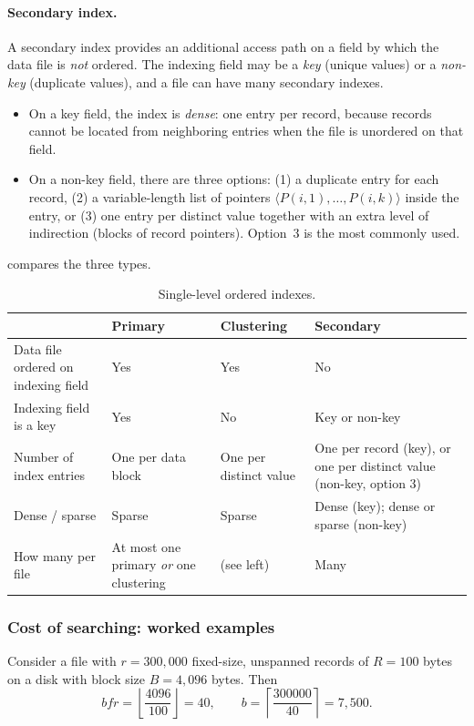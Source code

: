 \paragraph{Secondary index.}
A secondary index provides an additional access path on a field by which the data file is
\emph{not} ordered. The indexing field may be a \emph{key} (unique values) or a \emph{non-key}
(duplicate values), and a file can have many secondary indexes.
\begin{itemize}
  \item On a key field, the index is \emph{dense}: one entry per record, because records cannot
        be located from neighboring entries when the file is unordered on that field.
  \item On a non-key field, there are three options: (1) a duplicate entry for each record, (2)
        a variable-length list of pointers $\langle P(i,1),\dots,P(i,k)\rangle$ inside the entry,
        or (3) one entry per distinct value together with an extra level of indirection (blocks
        of record pointers). Option~3 is the most commonly used.
\end{itemize}

 compares the three types.

\begin{table}[H]
\centering
\small
\begin{tabularx}{\textwidth}{@{}l>{\raggedright\arraybackslash}X>{\raggedright\arraybackslash}X>{\raggedright\arraybackslash}X@{}}
\toprule
 & \textbf{Primary} & \textbf{Clustering} & \textbf{Secondary} \\
\midrule
Data file ordered on indexing field & Yes & Yes & No \\
Indexing field is a key & Yes & No & Key or non-key \\
Number of index entries & One per data block & One per distinct value & One per record (key), or one per distinct value (non-key, option 3) \\
Dense / sparse & Sparse & Sparse & Dense (key); dense or sparse (non-key) \\
How many per file & At most one primary \emph{or} one clustering & (see left) & Many \\
\bottomrule
\end{tabularx}
\caption{Single-level ordered indexes.}
\label{tab:single-level}
\end{table}

\subsubsection{Cost of searching: worked examples}
\label{sec:index-examples}
Consider a file with $r = 300{,}000$ fixed-size, unspanned records of $R = 100$ bytes on a disk
with block size $B = 4{,}096$ bytes. Then
\[
bfr = \left\lfloor \frac{4096}{100} \right\rfloor = 40, \qquad
b = \left\lceil \frac{300000}{40} \right\rceil = 7{,}500 .
\]

